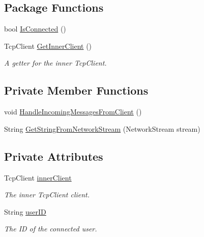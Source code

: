 \subsection*{Package Functions}
\begin{DoxyCompactItemize}
\item 
bool \hyperlink{class_e_l_i_server_1_1_messaging_1_1_client_message_socket_a6068ed137f8fa6fcafcfe24764444ca5}{Is\+Connected} ()
\item 
Tcp\+Client \hyperlink{class_e_l_i_server_1_1_messaging_1_1_client_message_socket_a22a77525ef761a701c8be319d5e31a50}{Get\+Inner\+Client} ()
\begin{DoxyCompactList}\small\item\em A getter for the inner Tcp\+Client. \end{DoxyCompactList}\end{DoxyCompactItemize}
\subsection*{Private Member Functions}
\begin{DoxyCompactItemize}
\item 
void \hyperlink{class_e_l_i_server_1_1_messaging_1_1_client_message_socket_a79f0022875996b0902f22bf3db2eed9b}{Handle\+Incoming\+Messages\+From\+Client} ()
\item 
String \hyperlink{class_e_l_i_server_1_1_messaging_1_1_client_message_socket_af243c323ef5f9a2e49b4ea5eb8de1dab}{Get\+String\+From\+Network\+Stream} (Network\+Stream stream)
\end{DoxyCompactItemize}
\subsection*{Private Attributes}
\begin{DoxyCompactItemize}
\item 
Tcp\+Client \hyperlink{class_e_l_i_server_1_1_messaging_1_1_client_message_socket_a1ef8df027624ee609a4d32db7ccdd2ef}{inner\+Client}
\begin{DoxyCompactList}\small\item\em The inner Tcp\+Client client. \end{DoxyCompactList}\item 
String \hyperlink{class_e_l_i_server_1_1_messaging_1_1_client_message_socket_a133a6eff37e294286e2777799bc644f4}{user\+ID}
\begin{DoxyCompactList}\small\item\em The ID of the connected user. \end{DoxyCompactList}\end{DoxyCompactItemize}


